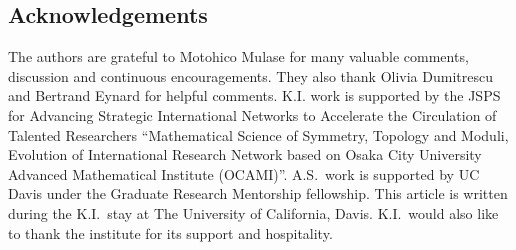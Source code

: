 \documentclass[pdftex]{sigma}
\theoremstyle{definition}
\numberwithin{equation}{section}
\begin{document}
\subsection*{Acknowledgements}
The authors are grateful to
Motohico Mulase for many valuable comments,
discussion and continuous encouragements.
They also thank
Olivia Dumitrescu and Bertrand Eynard
for helpful comments.
K.I. work is supported by the JSPS for
Advancing Strategic International Networks to Accelerate
the Circulation of Talented Researchers
``Mathematical Science of Symmetry, Topology and Moduli,
Evolution of International Research Network
based on Osaka City University Advanced Mathematical Institute
(OCAMI)''.
A.S.~work is supported by UC Davis under the Graduate
Research Mentorship fellowship.
This article is written during the
K.I.~stay at The University of California, Davis.
K.I.~would also like to thank the
institute for its support and hospitality.
\end{document}

